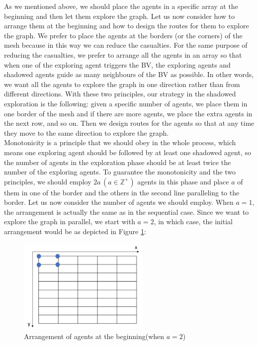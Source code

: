 As we mentioned above, we should place the agents in a specific array at the beginning and then let them explore the graph. Let us now   consider how to arrange them at the beginning and how to design the routes for them to explore the graph. We prefer to place the agents at the borders (or the corners) of the mesh because in this way we can reduce the casualties. For the same purpose of reducing the casualties, we prefer to arrange all the agents in an array so that when one of the exploring agent triggers the BV, the exploring agents and shadowed agents guide as many neighbours of the BV as possible. In other words, we want all the agents to explore the graph in one direction rather than   from different directions. With these two principles, our strategy in the shadowed exploration is the following:
 given a specific number of agents, we place them in one border of the mesh and if there are more agents, we place the extra agents in the next  row, and so on. Then we design routes for the agents so that at any time they move to the same direction to explore the graph. \\
Monotonicity is a principle that we should obey in the whole process, which means one exploring agent should be followed by at least one shadowed agent, so the number of agents in the exploration phase should be at least twice the number of the exploring agents. To guarantee the monotonicity and the two principles, we should employ $2a\,(a\in\mathbb{Z}^+)$ agents in this phase and place $a$ of them in one of the border and the others in the second line paralleling to the border.
Let us now consider the number of agents we should employ.
When $a=1$, the arrangement is actually the same as in the sequential case. Since we want to explore the graph in parallel,  we start with  $a=2$, in which case, the initial arrangement would be as depicted in Figure \ref{fig:twoagent1}:
\begin{figure}[H]
  \centering  
  \includegraphics[width=2.5in]{figures/twoagent1.png}
  \caption{Arrangement of agents at the beginning(when $a=2$)}\label{fig:twoagent1}
\end{figure}

